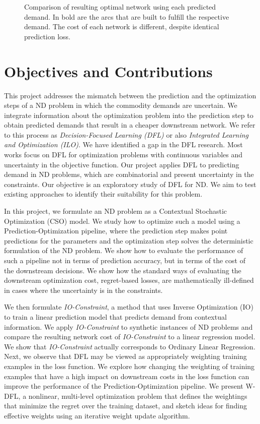 \begin{figure}[ht]
    
    \caption{Comparison of resulting optimal network using each predicted demand. In bold are the arcs that are built to fulfill the respective demand. The cost of each network is different, despite identical prediction loss.}
    \label{fig:intro:example-optimization}
\end{figure}
\newpage

\section{Objectives and Contributions}

This project addresses the mismatch between the prediction and the optimization steps of a ND problem in which the commodity demands are uncertain. We integrate information about the optimization problem into the prediction step to obtain predicted demands that result in a cheaper downstream network. We refer to this process as \textit{Decision-Focused Learning (DFL)} or also \textit{Integrated Learning and Optimization (ILO)}. We have identified a gap in the DFL research. Most works focus on DFL for optimization problems with continuous variables and uncertainty in the objective function. Our project applies DFL to predicting demand in ND problems, which are combinatorial and present uncertainty in the constraints. Our objective is an exploratory study of DFL for ND. We aim to test existing approaches to identify their suitability for this problem.

In this project, we formulate an ND problem as a Contextual Stochastic Optimization (CSO) model. We study how to optimize such a model using a Prediction-Optimization pipeline, where the prediction step makes point predictions for the parameters and the optimization step solves the deterministic formulation of the ND problem. We show how to evaluate the performance of such a pipeline not in terms of prediction accuracy, but in terms of the cost of the downstream decisions. We show how the standard ways of evaluating the downstream optimization cost, regret-based losses, are mathematically ill-defined in cases where the uncertainty is in the constraints. 

We then formulate \textit{IO-Constraint}, a method that uses Inverse Optimization (IO) to train a linear prediction model that predicts demand from contextual information. We apply \textit{IO-Constraint} to synthetic instances of ND problems and compare the resulting network cost of \textit{IO-Constraint} to a linear regression model. We show that \textit{IO-Constraint} actually corresponds to Ordinary Linear Regression. Next, we observe that DFL may be viewed as appropriately weighting training examples in the loss function. We explore how changing the weighting of training examples that have a high impact on downstream costs in the loss function can improve the performance of the Prediction-Optimization pipeline. We present W-DFL, a nonlinear, multi-level optimization problem that defines the weightings that minimize the regret over the training dataset, and sketch ideas for finding effective weights using an iterative weight update algorithm.

